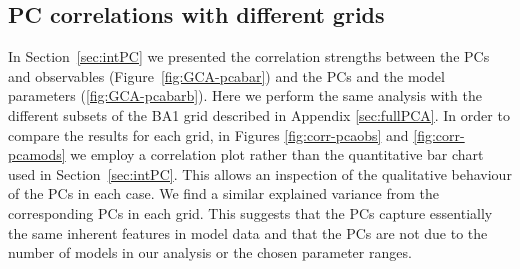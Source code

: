 \subsection{PC correlations with different grids}
\label{sec:PCAg}
In Section~\ref{sec:intPC}  we presented the correlation strengths between the PCs and observables (Figure~\ref{fig:GCA-pcabar}) and the PCs and the model parameters (\ref{fig:GCA-pcabarb}). 
 Here we perform the same analysis with the different subsets of the BA1 grid described in Appendix \ref{sec:fullPCA}. In order to compare the results for each grid, in Figures \ref{fig:corr-pcaobs} and \ref{fig:corr-pcamods} we employ a correlation plot rather than the quantitative bar chart used in Section~\ref{sec:intPC}. This allows an inspection of the qualitative behaviour of the PCs in each case. We find a similar explained variance from the corresponding PCs in each grid. This suggests that the PCs capture essentially the same inherent features in model data and that the PCs are not due to the number of models in our analysis or the chosen parameter ranges.


